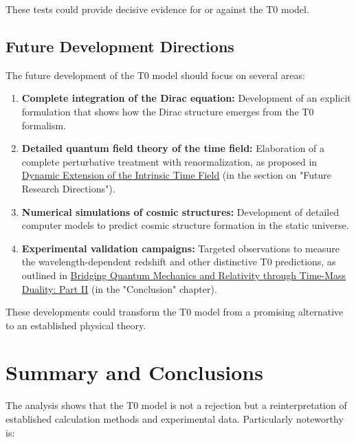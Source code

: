 \documentclass[12pt,a4paper]{article}
\begin{document}
	These tests could provide decisive evidence for or against the T0 model.
	
	\subsection{Future Development Directions}
	\label{subsec:future_directions}
	
	The future development of the T0 model should focus on several areas:
	
	\begin{enumerate}
		\item \textbf{Complete integration of the Dirac equation:} Development of an explicit formulation that shows how the Dirac structure emerges from the T0 formalism.
		
		\item \textbf{Detailed quantum field theory of the time field:} Elaboration of a complete perturbative treatment with renormalization, as proposed in \href{https://github.com/jpascher/T0-Time-Mass-Duality/tree/main/2/pdf/English/DynamicTF-SchrodingerExtensions_En.pdf}{Dynamic Extension of the Intrinsic Time Field} (in the section on "Future Research Directions").
		
		\item \textbf{Numerical simulations of cosmic structures:} Development of detailed computer models to predict cosmic structure formation in the static universe.
		
		\item \textbf{Experimental validation campaigns:} Targeted observations to measure the wavelength-dependent redshift and other distinctive T0 predictions, as outlined in \href{https://github.com/jpascher/T0-Time-Mass-Duality/tree/main/2/pdf/English/QMRelTimeMassPart2En.pdf}{Bridging Quantum Mechanics and Relativity through Time-Mass Duality: Part II} (in the "Conclusion" chapter).
	\end{enumerate}
	
	These developments could transform the T0 model from a promising alternative to an established physical theory.
	
	\section{Summary and Conclusions}
	\label{sec:conclusion}
	
	The analysis shows that the T0 model is not a rejection but a reinterpretation of established calculation methods and experimental data. Particularly noteworthy is:
	
\end{document}
